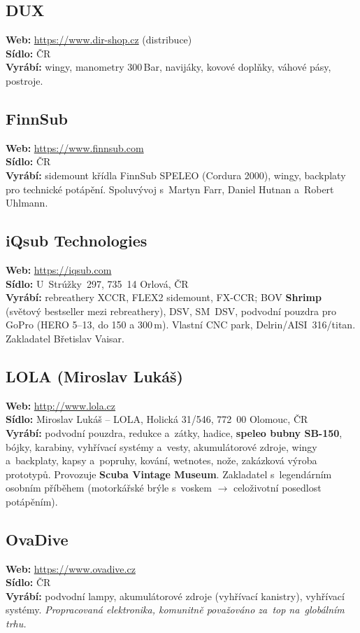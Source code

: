 \documentclass[11pt,a4paper]{article}
\begin{document}
\subsection{DUX}
\textbf{Web:} \url{https://www.dir-shop.cz} (distribuce) \\
\textbf{Sídlo:} ČR \\
\textbf{Vyrábí:} wingy, manometry 300\,Bar, navijáky, kovové doplňky, váhové pásy, postroje.

\subsection{FinnSub}
\textbf{Web:} \url{https://www.finnsub.com} \\
\textbf{Sídlo:} ČR \\
\textbf{Vyrábí:} sidemount křídla FinnSub SPELEO (Cordura 2000), wingy, backplaty pro technické potápění. Spoluvývoj s~Martyn Farr, Daniel Hutnan a~Robert Uhlmann.

\subsection{iQsub Technologies}
\textbf{Web:} \url{https://iqsub.com} \\
\textbf{Sídlo:} U~Strúžky~297, 735~14 Orlová, ČR \\
\textbf{Vyrábí:} rebreathery XCCR, FLEX2 sidemount, FX-CCR; BOV \textbf{Shrimp} (světový bestseller mezi rebreathery), DSV, SM~DSV, podvodní pouzdra pro GoPro (HERO 5--13, do 150 a 300\,m). Vlastní CNC park, Delrin/AISI~316/titan. Zakladatel Břetislav Vaisar.

\subsection{LOLA (Miroslav Lukáš)}
\textbf{Web:} \url{http://www.lola.cz} \\
\textbf{Sídlo:} Miroslav Lukáš -- LOLA, Holická 31/546, 772~00 Olomouc, ČR \\
\textbf{Vyrábí:} podvodní pouzdra, redukce a~zátky, hadice, \textbf{speleo bubny SB-150}, bójky, karabiny, vyhřívací systémy a~vesty, akumulátorové zdroje, wingy a~backplaty, kapsy a~popruhy, kování, wetnotes, nože, zakázková výroba prototypů. Provozuje \textbf{Scuba Vintage Museum}. Zakladatel s~legendárním osobním příběhem (motorkářské brýle s~voskem $\rightarrow$ celoživotní posedlost potápěním).

\subsection{OvaDive}
\textbf{Web:} \url{https://www.ovadive.cz} \\
\textbf{Sídlo:} ČR \\
\textbf{Vyrábí:} podvodní lampy, akumulátorové zdroje (vyhřívací kanistry), vyhřívací systémy. \emph{Propracovaná elektronika, komunitně považováno za~top na~globálním trhu.}
\end{document}
